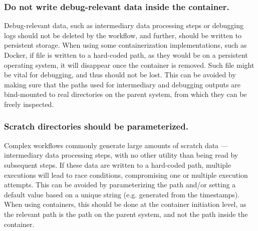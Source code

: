 \subsubsection{Do not write debug-relevant data inside the container.}
Debug-relevant data, such as intermediary data processing steps or debugging logs should not be deleted by the workflow, and further, should be written to persistent storage.
When using some containerization implementations, such as Docker, if file is written to a hard-coded path, as they would be on a persistent operating system, it will disappear once the container is removed.
Such file might be vital for debugging, and thus should not be lost.
This can be avoided by making sure that the paths used for intermediary and debugging outputs are bind-mounted to real directories on the parent system, from which they can be freely inspected.

\subsubsection{Scratch directories should be parameterized.}
Complex workflows commonly generate large amounts of scratch data — intermediary data processing steps, with no other utility than being read by subsequent steps.
If these data are written to a hard-coded path, multiple executions will lead to race conditions, compromising one or multiple execution attempts.
This can be avoided by parameterizing the path and/or setting a default value based on a unique string (e.g. generated from the timestamps).
When using containers, this should be done at the container initiation level, as the relevant path is the path on the parent system, and not the path inside the container.

